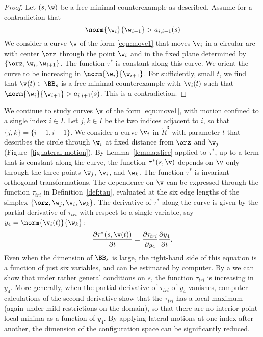 \begin{proof}
Let $(s,\w)$ be a free minimal counterexample as described.
Assume for a contradiction that 
\[
\norm{\w_i}{\w_{i-1}}>a_{i,i-1}(s)
\]
We consider a curve $\v$ of the form \eqref{eqn:move1} that moves $\v_i$
in a circular arc with center $\orz$ through the point $\w_i$ and in
the fixed plane determined by $\{\orz,\w_i,\w_{i+1}\}$.  The function $\tau^*$ is
constant along this curve.  We orient the curve to be increasing
in $\norm{\w_i}{\w_{i+1}}$.  For sufficiently, small $t$, we find that
$\v(t)\in\BB_s$ is a free minimal counterexample with $\v_i(t)$ such that
$\norm{\w_i}{\w_{i+1}} > a_{i,i+1}(s)$. This is a contradiction.
\end{proof}

%
\begin{remark}\label{rem:contract}
  We continue to study curves $\v$ of the form \eqref{eqn:move1}, with
  motion confined to a single index $i\in I$. Let $j,k\in I$ be the
  two indices adjacent to $i$, so that $\{j,k\}=\{i-1,i+1\}$.  We
  consider a curve $\v_i$ in $\ring{R}^3$ with parameter $t$ that
  describes the circle through $\w_i$ at fixed distance from $\orz$
  and $\w_j$ (Figure~\ref{fig:lateral-motion}).  By 
  Lemma~\ref{lemma:slice} applied to $\tau^*$, 
  up to a term that is constant along the
  curve, the function $\tau^*(s,\v)$ depends on $\v$ only through the
  three points $\w_j$, $\v_i$, and $\w_k$.  The function $\tau^*$ is
  invariant orthogonal transformations.  The dependence on $\v$ can be
  expressed through the function $\tau_{tri}$ in
  Definition~\ref{def:tau}, evaluated at the six edge lengths of the
  simplex $\{ \orz,\w_j,\v_i,\w_k \}$.  The derivative of $\tau^*$
  along the curve is given by the partial derivative of $\tau_{tri}$ with
  respect to a single variable, say $y_4=\norm{\v_i(t)}{\w_k}$:
 \begin{equation}\label{eqn:tau-partial}
 \frac{\partial \tau^*(s,\v(t))}{\partial t} = \frac{\partial \tau_{tri}}{\partial y_4}
 \frac{\partial y_4}{\partial t}.
 \end{equation}  
 Even when the dimension of
  $\BB_s$ is large, the right-hand side of this equation is a function
of just six variables,
  and can be estimated by computer.  By a  we can show that
  under rather general conditions on $s$, the function $\tau_{tri}$ is
  increasing in $y_4$.  More generally, when the partial derivative
  of $\tau_{tri}$ of $y_4$ vanishes, computer calculations of the
  second derivative show that the $\tau_{tri}$ has a local maximum
  (again under mild restrictions on the domain), so that there are no
  interior point local minima as a function of $y_4$.  By applying lateral
  motions at one index after another, the dimension of the configuration space
  can be significantly reduced.
\end{remark}

